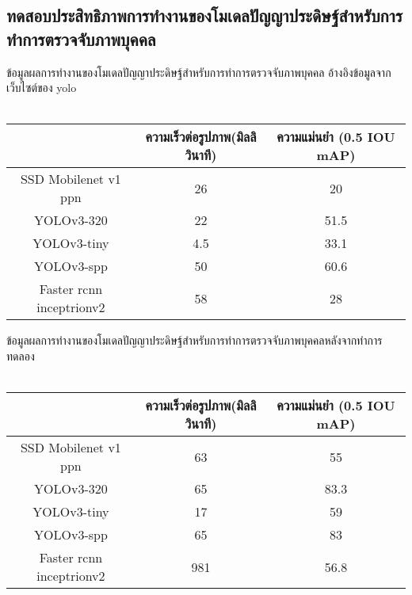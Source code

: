 
\subsection{ทดสอบประสิทธิภาพการทำงานของโมเดลปัญญาประดิษฐ์สำหรับการทำการตรวจจับภาพบุคคล}
 ข้อมูลผลการทำงานของโมเดลปัญญาประดิษฐ์สำหรับการทำการตรวจจับภาพบุคคล อ้างอิงข้อมูลจากเว็บไซต์ของ yolo			\\
\\
\begin{tabular}{|c|c|c|}
		\hline
		{}&{ความเร็วต่อรูปภาพ(มิลลิวินาที)}&{ความแม่นยำ (0.5 IOU mAP)}			\\
		\hline
		SSD Mobilenet v1 ppn	 		& 26				& 20														\\
		YOLOv3-320				& 22				& 51.5				\\	
		YOLOv3-tiny				& 4.5				& 33.1				\\
		YOLOv3-spp				& 50				& 60.6				\\	
		Faster rcnn inceptrionv2		& 58				& 28		\\
	\hline
\end{tabular}

ข้อมูลผลการทำงานของโมเดลปัญญาประดิษฐ์สำหรับการทำการตรวจจับภาพบุคคลหลังจากทำการทดลอง
\\\\
\begin{tabular}{|c|c|c|}
		\hline 
		{}&{ความเร็วต่อรูปภาพ(มิลลิวินาที)}&{ความแม่นยำ (0.5 IOU mAP)}			\\
		\hline
		SSD Mobilenet v1 ppn	 					& 63 			& 55			\\
		YOLOv3-320							& 65			& 83.3		\\
		YOLOv3-tiny							& 17			& 59			\\
		YOLOv3-spp							& 65			& 83			\\	
		Faster rcnn inceptrionv2					& 981		& 56.8		\\
	\hline
\end{tabular}
